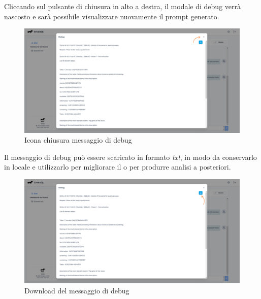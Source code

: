 \par Cliccando sul pulsante di chiusura in alto a destra, il modale di debug verrà nascosto e sarà possibile visualizzare nuovamente il prompt generato.
\begin{figure}[H]
  \centering
  \includegraphics[width=\textwidth]{assets/tasto_close_debug.png}
  \caption{Icona chiusura messaggio di debug}
\end{figure}


\par Il messaggio di debug può essere scaricato in formato \textit{txt}, in modo da conservarlo in locale e utilizzarlo per migliorare il  o per produrre analisi a posteriori.
\begin{figure}[H]
  \centering
  \includegraphics[width=\textwidth]{assets/tasto_dawnload_debug.png}
  \caption{Download del messaggio di debug}
\end{figure}





